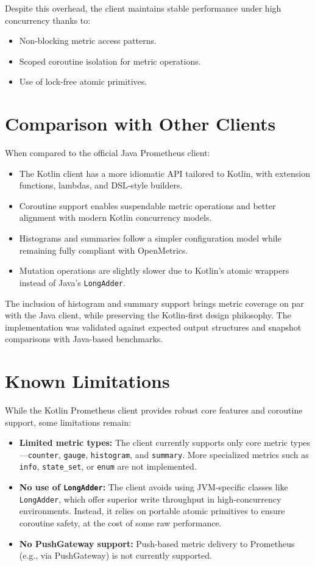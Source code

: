 Despite this overhead, the client maintains stable performance under high concurrency thanks to:
\begin{itemize}
  \item Non-blocking metric access patterns.
  \item Scoped coroutine isolation for metric operations.
  \item Use of lock-free atomic primitives.
\end{itemize}

\section{Comparison with Other Clients}

When compared to the official Java Prometheus client:
\begin{itemize}
  \item The Kotlin client has a more idiomatic API tailored to Kotlin, with extension functions, lambdas, and DSL-style builders.
  \item Coroutine support enables suspendable metric operations and better alignment with modern Kotlin concurrency models.
  \item Histograms and summaries follow a simpler configuration model while remaining fully compliant with OpenMetrics.
  \item Mutation operations are slightly slower due to Kotlin's atomic wrappers instead of Java's \texttt{LongAdder}.
\end{itemize}

The inclusion of histogram and summary support brings metric coverage on par with the Java client, while preserving the Kotlin-first design philosophy. The implementation was validated against expected output structures and snapshot comparisons with Java-based benchmarks.

\section{Known Limitations}

While the Kotlin Prometheus client provides robust core features and coroutine support, some limitations remain:
\begin{itemize}
  \item \textbf{Limited metric types:} The client currently supports only core metric types—\texttt{counter}, \texttt{gauge}, \texttt{histogram}, and \texttt{summary}. More specialized metrics such as \texttt{info}, \texttt{state\_set}, or \texttt{enum} are not implemented.
  \item \textbf{No use of \texttt{LongAdder}:} The client avoids using JVM-specific classes like \texttt{LongAdder}, which offer superior write throughput in high-concurrency environments. Instead, it relies on portable atomic primitives to ensure coroutine safety, at the cost of some raw performance.
  \item \textbf{No PushGateway support:} Push-based metric delivery to Prometheus (e.g., via PushGateway) is not currently supported.
\end{itemize}

